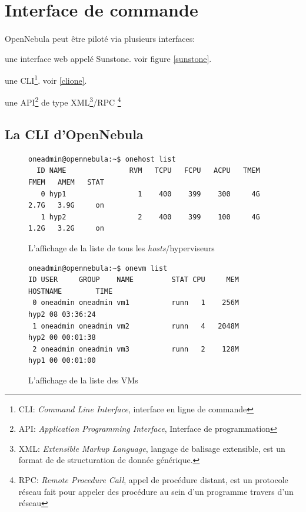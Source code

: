 \section{Interface de commande}
\paragraph*{}
OpenNebula peut être piloté via plusieurs interfaces:
\begin{listi}
	\item une interface web appelé Sunstone. voir figure \ref{sunstone}.
	\item une CLI\footnote{CLI: \emph{Command Line Interface}, interface en ligne de commande}. voir \ref{clione}.
	\item une API\footnote{API: \emph{Application Programming Interface}, Interface de programmation} de type
		XML\footnote{XML: \emph{Extensible Markup Language}, langage de balisage extensible, est un format de de structuration de donnée générique.}/RPC
		\footnote{RPC: \emph{Remote Procedure Call}, appel de procédure distant, est un protocole réseau fait pour appeler des procédure au sein d'un programme
		travers d'un réseau}
\end{listi}

\subsection{La CLI d'OpenNebula}
\label{onecli}

\begin{figure}[H]
\centering
\begin{lstlisting}
oneadmin@opennebula:~$ onehost list
  ID NAME               RVM   TCPU   FCPU   ACPU   TMEM   FMEM   AMEM   STAT
   0 hyp1                 1    400    399    300     4G   2.7G   3.9G     on
   1 hyp2                 2    400    399    100     4G   1.2G   3.2G     on
\end{lstlisting}
\caption{L'affichage de la liste de tous les \emph{hosts}/hyperviseurs}
\end{figure}


\begin{figure}[H]
\centering
\begin{lstlisting}
oneadmin@opennebula:~$ onevm list
ID USER     GROUP    NAME         STAT CPU     MEM        HOSTNAME        TIME
 0 oneadmin oneadmin vm1          runn   1    256M            hyp2 08 03:36:24
 1 oneadmin oneadmin vm2          runn   4   2048M            hyp2 00 00:01:38
 2 oneadmin oneadmin vm3          runn   2    128M            hyp1 00 00:01:00
\end{lstlisting}
\caption{L'affichage de la liste des VMs}
\end{figure}




